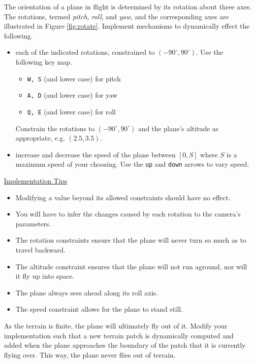 \documentclass[addpoints]{exam}
\begin{document}
\begin{questions}
  The orientation of a plane in flight is determined by its rotation about three axes. The rotations, termed \textit{pitch}, \textit{roll}, and \textit{yaw}, and the corresponding axes are illustrated in Figure \ref{fig:rotate}. Implement mechanisms to dynamically effect the following.
  \begin{itemize}
  \item each of the indicated rotations, constrained to $(-90^\circ, 90^\circ)$. Use the following key map.
    \begin{itemize}
    \item \texttt{W, S} (and lower case) for pitch
    \item \texttt{A, D} (and lower case) for yaw
    \item \texttt{Q, E} (and lower case) for roll
    \end{itemize}
    Constrain the rotations to $(-90^\circ, 90^\circ)$ and the plane's altitude as appropriate, e.g. $(2.5, 3.5)$.
  \item increase and decrease the speed of the plane between $[0,S]$ where $S$ is a maximum speed of your choosing. Use the \texttt{up} and \texttt{down} arrows to vary speed.
  \end{itemize}

    \noindent\underline{Implementation Tips}
    \begin{itemize}
    \item Modifying a value beyond its allowed constraints should have no effect.
    \item You will have to infer the changes caused by each rotation to the camera's parameters.
    \item The rotation constraints ensure that the plane will never turn so much as to travel backward.
    \item The altitude constraint ensures that the plane will not run aground, nor will it fly up into space.
    \item The plane always sees ahead along its roll axis.
    \item The speed constraint allows for the plane to stand still.
    \end{itemize}

    

    As the terrain is finite, the plane will ultimately fly out of it. Modify your implementation such that a new terrain patch is dynamically computed and added when the plane approaches the boundary of the patch that it is currently flying over. This way, the plane never flies out of terrain.


\end{questions}
\end{document}
